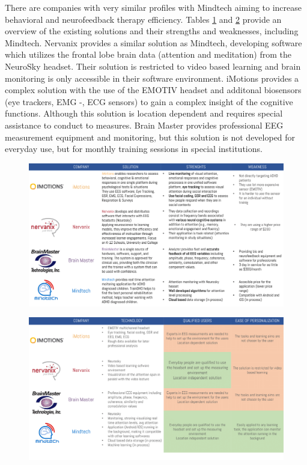 \documentclass[letterpaper,10pt]{article}
\begin{document}
There are companies with very similar profiles with Mindtech aiming to increase behavioral and neurofeedback therapy efficiency. Tables \ref{fig:competiotion} and \ref{fig:feature_comp} provide an overview of the existing solutions and their strengths and weaknesses, including Mindtech. Nervanix provides a similar solution as Mindtech, developing software which utilizes the frontal lobe brain data (attention and meditation) from the NeuroSky headset. Their solution is restricted to video based learning and brain monitoring is only accessible in their software environment. iMotions provides a complex solution with the use of the EMOTIV headset and additonal biosensors (eye trackers, EMG -, ECG sensors) to gain a complex insight of the cognitive functions. Although this solution is location dependent and requires special assistance to conduct to measures. Brain Master provides professional EEG measurement equipment and monitoring, but this solution is not developed for everyday use, but for monthly training sessions in special institutions.

\begin{figure}[h]
\centering
\includegraphics[scale=0.18]{competitive.png}
\label{fig:competiotion}
\end{figure}

\begin{figure}[h]
\centering
\includegraphics[scale=0.18]{competitive2.png}
\label{fig:feature_comp}
\end{figure}
\end{document}
